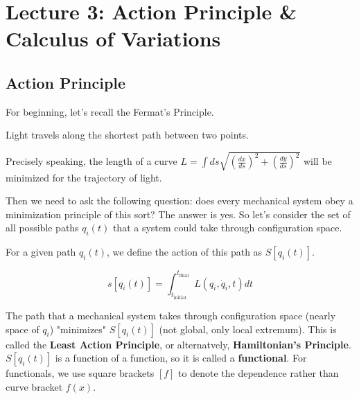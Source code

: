 \section{Lecture 3: Action Principle \& Calculus of Variations}

\subsection{Action Principle}

For beginning, let's recall the Fermat's Principle.

\begin{definition}
    Light travels along the shortest path between two points.
\end{definition}

Precisely speaking, the length of a curve $L = \int ds \sqrt{\left(\frac{dx}{ds}\right)^2 + \left(\frac{dy}{ds}\right)^2}$
will be minimized for the trajectory of light.

Then we need to ask the following question: does every mechanical system obey a 
minimization principle of this sort? The answer is yes. So let's consider the set of all
possible paths $q_i\left(t\right)$ that a system could take through configuration space.

For a given path $q_i\left(t\right)$, we define the action of this path as
$S[q_i\left(t\right)]$.

\[
    s[q_i\left(t\right)] = \int_{t_\text{initial}}^{t_\text{final}} L\left(q_i, \dot{q}_i, t\right) dt
\]

The path that a mechanical system takes through configuration space (nearly space of $q_i$)
"minimizes" $S[q_i\left(t\right)]$ (not global, only local extremum). This is called the
\textbf{Least Action Principle}, or alternatvely, \textbf{Hamiltonian's Principle}. 
$S[q_i\left(t\right)]$ is a function of a function, so it is called a \textbf{functional}.
For functionals, we use square brackets $[f]$ to denote the dependence rather than curve bracket
$f\left(x\right)$.

